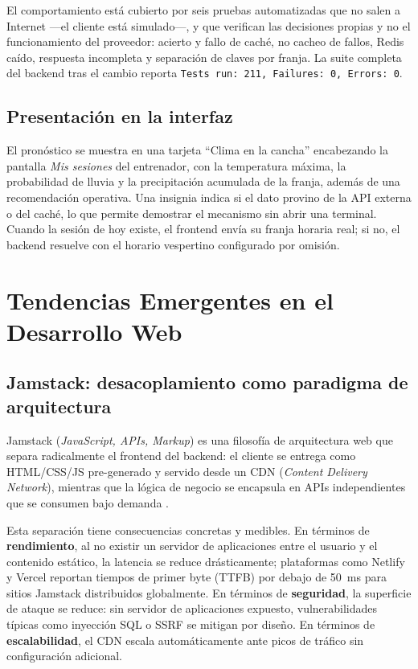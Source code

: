 \documentclass[12pt,a4paper]{article}
\begin{document}
El comportamiento está cubierto por seis pruebas automatizadas que no salen a Internet ---el
cliente está simulado---, y que verifican las decisiones propias y no el funcionamiento del
proveedor: acierto y fallo de caché, no cacheo de fallos, Redis caído, respuesta incompleta y
separación de claves por franja. La suite completa del backend tras el cambio reporta
\texttt{Tests run: 211, Failures: 0, Errors: 0}.

\subsection{Presentación en la interfaz}

El pronóstico se muestra en una tarjeta ``Clima en la cancha'' encabezando la pantalla
\textit{Mis sesiones} del entrenador, con la temperatura máxima, la probabilidad de lluvia y la
precipitación acumulada de la franja, además de una recomendación operativa. Una insignia indica
si el dato provino de la API externa o del caché, lo que permite demostrar el mecanismo sin
abrir una terminal. Cuando la sesión de hoy existe, el frontend envía su franja horaria real; si
no, el backend resuelve con el horario vespertino configurado por omisión.

\section{Tendencias Emergentes en el Desarrollo Web}
\label{sec:tendencias}

\subsection{Jamstack: desacoplamiento como paradigma de arquitectura}

Jamstack (\textit{JavaScript, APIs, Markup}) es una filosofía de arquitectura web que separa
radicalmente el frontend del backend: el cliente se entrega como HTML/CSS/JS pre-generado y
servido desde un CDN (\textit{Content Delivery Network}), mientras que la lógica de negocio
se encapsula en APIs independientes que se consumen bajo demanda \parencite{biilmann2020}.

Esta separación tiene consecuencias concretas y medibles.
En términos de \textbf{rendimiento}, al no existir un servidor de aplicaciones entre el
usuario y el contenido estático, la latencia se reduce drásticamente; plataformas como
Netlify y Vercel reportan tiempos de primer byte (TTFB) por debajo de 50~ms para sitios
Jamstack distribuidos globalmente.
En términos de \textbf{seguridad}, la superficie de ataque se reduce: sin servidor de
aplicaciones expuesto, vulnerabilidades típicas como inyección SQL o SSRF se mitigan por
diseño.
En términos de \textbf{escalabilidad}, el CDN escala automáticamente ante picos de tráfico
sin configuración adicional.
\end{document}
